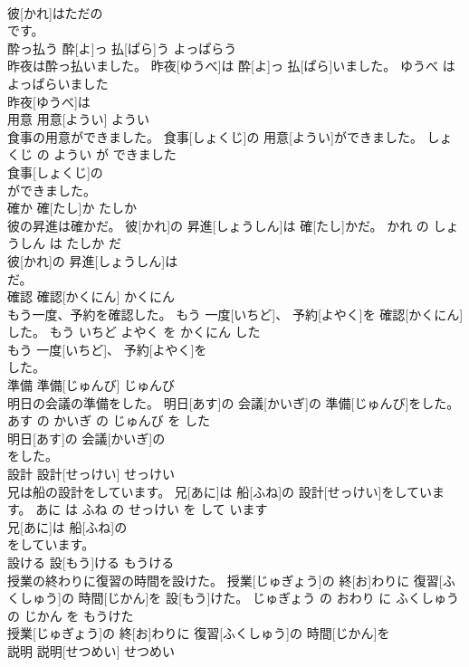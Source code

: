 \documentclass[8pt]{extreport}
\begin{document}
\begin{CJK}{UTF8}{min}
\\	彼[かれ]はただの
\\	です。			
\\	酔っ払う	酔[よ]っ 払[ぱら]う	よっぱらう	
\\	昨夜は酔っ払いました。	昨夜[ゆうべ]は 酔[よ]っ 払[ぱら]いました。	ゆうべ は よっぱらいました	
\\	昨夜[ゆうべ]は
\\	用意	用意[ようい]	ようい	
\\	食事の用意ができました。	食事[しょくじ]の 用意[ようい]ができました。	しょくじ の ようい が できました	
\\	食事[しょくじ]の
\\	ができました。			
\\	確か	確[たし]か	たしか	
\\	彼の昇進は確かだ。	彼[かれ]の 昇進[しょうしん]は 確[たし]かだ。	かれ の しょうしん は たしか だ	
\\	彼[かれ]の 昇進[しょうしん]は
\\	だ。			
\\	確認	確認[かくにん]	かくにん	
\\	もう一度、予約を確認した。	もう 一度[いちど]、 予約[よやく]を 確認[かくにん]した。	もう いちど よやく を かくにん した	
\\	もう 一度[いちど]、 予約[よやく]を
\\	した。			
\\	準備	準備[じゅんび]	じゅんび	
\\	明日の会議の準備をした。	明日[あす]の 会議[かいぎ]の 準備[じゅんび]をした。	あす の かいぎ の じゅんび を した	
\\	明日[あす]の 会議[かいぎ]の
\\	をした。			
\\	設計	設計[せっけい]	せっけい	
\\	兄は船の設計をしています。	兄[あに]は 船[ふね]の 設計[せっけい]をしています。	あに は ふね の せっけい を して います	
\\	兄[あに]は 船[ふね]の
\\	をしています。			
\\	設ける	設[もう]ける	もうける	
\\	授業の終わりに復習の時間を設けた。	授業[じゅぎょう]の 終[お]わりに 復習[ふくしゅう]の 時間[じかん]を 設[もう]けた。	じゅぎょう の おわり に ふくしゅう の じかん を もうけた	
\\	授業[じゅぎょう]の 終[お]わりに 復習[ふくしゅう]の 時間[じかん]を
\\	説明	説明[せつめい]	せつめい	

\end{CJK}
\end{document}
